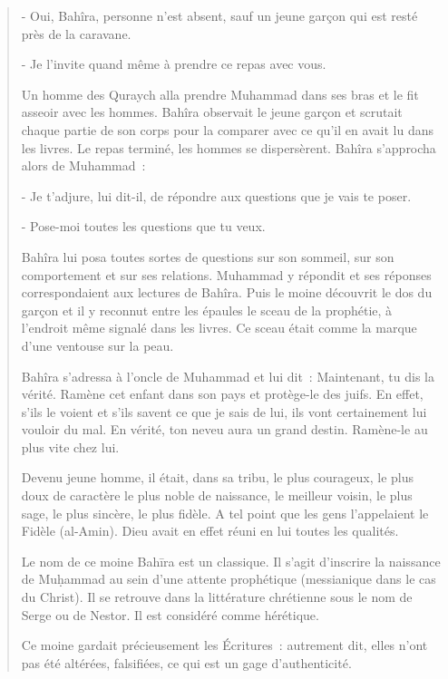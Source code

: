 \begin{quotation}
- Oui, Bahîra, personne n'est absent, sauf un jeune garçon qui est resté
près de la caravane.

- Je l'invite quand même à prendre ce repas avec vous.

Un homme des Quraych alla prendre Muhammad dans ses bras et le fit
asseoir avec les hommes. Bahîra observait le jeune garçon et scrutait
chaque partie de son corps pour la comparer avec ce qu'il en avait lu
dans les livres. Le repas terminé, les hommes se dispersèrent. Bahîra
s'approcha alors de Muhammad~:

- Je t'adjure, lui dit-il, de répondre aux questions que je vais te
poser.

- Pose-moi toutes les questions que tu veux.

Bahîra lui posa toutes sortes de questions sur son sommeil, sur son
comportement et sur ses relations. Muhammad y répondit et ses réponses
correspondaient aux lectures de Bahîra. Puis le moine découvrit le dos
du garçon et il y reconnut entre les épaules le sceau de la prophétie, à
l'endroit même signalé dans les livres. Ce sceau était comme la marque
d'une ventouse sur la peau.

Bahîra s'adressa à l'oncle de Muhammad et lui dit~: Maintenant, tu dis
la vérité. Ramène cet enfant dans son pays et protège-le des juifs. En
effet, s'ils le voient et s'ils savent ce que je sais de lui, ils vont
certainement lui vouloir du mal. En vérité, ton neveu aura un grand
destin. Ramène-le au plus vite chez lui.

Devenu jeune homme, il était, dans sa tribu, le plus courageux, le plus
doux de caractère le plus noble de naissance, le meilleur voisin, le
plus sage, le plus sincère, le plus fidèle. A tel point que les gens
l'appelaient le Fidèle (al-Amin). Dieu avait en effet réuni en lui
toutes les qualités.

Le nom de ce moine Bahīra est un classique. Il s'agit d'inscrire la
naissance de Muḥammad au sein d'une attente prophétique (messianique
dans le cas du Christ). Il se retrouve dans la littérature chrétienne
sous le nom de Serge ou de Nestor. Il est considéré comme hérétique.

Ce moine gardait précieusement les Écritures~: autrement dit, elles
n'ont pas été altérées, falsifiées, ce qui est un gage d'authenticité.
\end{quotation}
